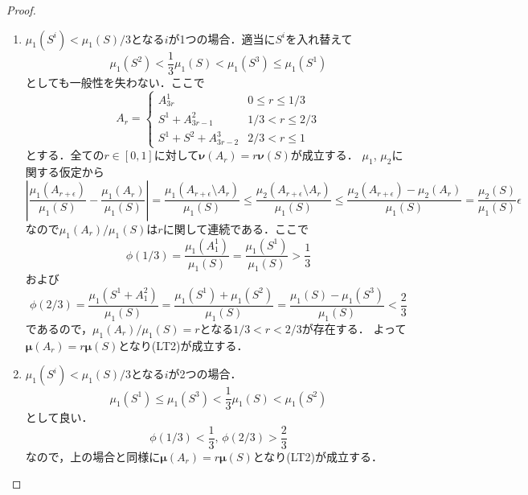 \begin{proof}
\begin{enumerate}
    \item \(\mu_1(S^i)<\mu_1(S)/3\)となる\(i\)が1つの場合．適当に\(S^i\)を入れ替えて
    \[ \mu_1(S^2) < \frac{1}{3} \mu_1(S) < \mu_1(S^3) \leq \mu_1(S^1) \]
    としても一般性を失わない．ここで
    \[
    A_r=
    \begin{cases}
      A^1_{3r} & 0 \leq r\leq 1/3 \\
      S^1 + A^2_{3r-1} & 1/3 < r\leq 2/3 \\
      S^1 + S^2 + A^3_{3r-2} & 2/3 < r\leq 1
    \end{cases}
    \]
    とする．全ての\(r\in[0,1]\)に対して\(\boldsymbol\nu(A_r)=r\boldsymbol\nu(S)\)が成立する．
    \(\mu_1\), \(\mu_2\)に関する仮定から
    \[
    \left\lvert \frac{\mu_1(A_{r+\epsilon})}{\mu_1(S)} - \frac{\mu_1(A_{r})}{\mu_1(S)} \right\rvert
    = \frac{\mu_1(A_{r+\epsilon}\setminus A_r)}{\mu_1(S)}
    \leq \frac{\mu_2(A_{r+\epsilon}\setminus A_r)}{\mu_1(S)}
    \leq \frac{\mu_2(A_{r+\epsilon})-\mu_2(A_{r})}{\mu_1(S)}
    = \frac{\mu_2(S)}{\mu_1(S)} \epsilon
    \]
    なので\(\mu_1(A_r)/\mu_1(S)\)は\(r\)に関して連続である．ここで
    \[ \phi(1/3) = \frac{\mu_1(A^1_1)}{\mu_1(S)} = \frac{\mu_1(S^1)}{\mu_1(S)} > \frac{1}{3}  \]
    および
    \[ \phi(2/3) = \frac{\mu_1(S^1+A^2_1)}{\mu_1(S)} = \frac{\mu_1(S^1)+\mu_1(S^2)}{\mu_1(S)} = \frac{\mu_1(S)-\mu_1(S^3)}{\mu_1(S)} < \frac{2}{3} \]
    であるので，\(\mu_1(A_r)/\mu_1(S)=r\)となる\(1/3<r<2/3\)が存在する．
    よって\(\boldsymbol\mu(A_r) = r\boldsymbol\mu(S)\)となり(LT2)が成立する．

    \item \(\mu_1(S^i)<\mu_1(S)/3\)となる\(i\)が2つの場合．
    \[ \mu_1(S^1) \leq \mu_1(S^3) < \frac{1}{3} \mu_1(S) < \mu_1(S^2) \]
    として良い．
    \[ \phi(1/3) < \frac{1}{3} , \, \phi(2/3) > \frac{2}{3} \]
    なので，上の場合と同様に\(\boldsymbol\mu(A_r) = r\boldsymbol\mu(S)\)となり(LT2)が成立する．
  \end{enumerate}
\end{proof}

